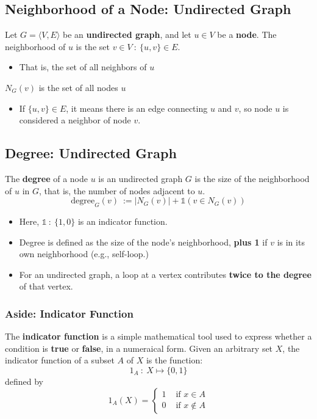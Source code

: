 \documentclass[10pt]{article}
\begin{document}
\subsection*{Neighborhood of a Node: Undirected Graph}
Let $G = \langle V, E \rangle$ be an \textbf{undirected graph}, and let $u \in V$ be a \textbf{node}.  The neighborhood of $u$ is the set $v \in V \::\: \{u, v\} \in E$.
\begin{itemize}
	\item That is, the set of all neighbors of $u$
\end{itemize}
$N_G(v)$ is the set of all nodes $u$
\begin{itemize}
	\item If $\{u, v\} \in E$, it means there is an edge connecting $u$ and $v$, so node $u$ is considered a neighbor of node $v$.
\end{itemize}

\subsection*{Degree: Undirected Graph}
The \textbf{degree} of a node $u$ is an undirected graph $G$ is the size of the neighborhood of $u$ in $G$, that is, the number of nodes adjacent to $u$.
\[\text{degree}_G(v) \::= |N_G(v)| + \mathds{1}(v \in N_G(v))\]
\begin{itemize}
	\item Here, $\mathds{1} \::\: \{1, 0\}$ is an indicator function.
	\item Degree is defined as the size of the node's neighborhood, \textbf{plus 1} if $v$ is in its own neighborhood (e.g., self-loop.)
	\item For an undirected graph, a loop at a vertex contributes \textbf{twice to the degree} of that vertex.
\end{itemize}

\subsubsection*{Aside: Indicator Function}
The \textbf{indicator function} is a simple mathematical tool used to express whether a condition is \textbf{true} or \textbf{false}, in a numeraical form.  Given an arbitrary set $X$, the indicator function of a subset $A$ of $X$ is the function:
\[1_A \::\: X \mapsto \{0, 1\}\]
defined by
\[1_A(X) = \begin{cases}1 &\text{ if }x \in A \\ 0 &\text{ if }x \notin A\end{cases}\]
\end{document}
